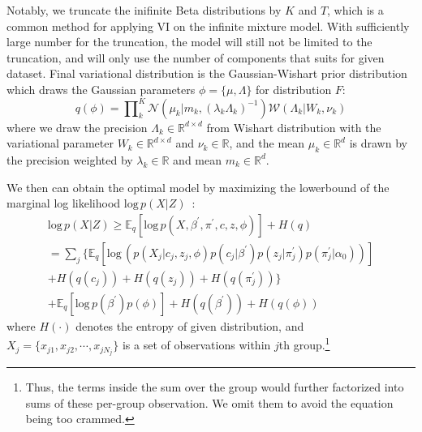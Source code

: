\documentclass{article}
\begin{document}
Notably, we truncate the inifinite Beta distributions by $K$ and $T$, which is a common method for applying VI on the infinite mixture model. With sufficiently large number for the truncation, the model will still not be limited to the truncation, and will only use the number of components that suits for given dataset. Final variational distribution is the Gaussian-Wishart prior distribution which draws the Gaussian parameters $\phi = \{\mu, \Lambda\}$ for distribution $F$:
\begin{equation}\label{eq:meanfield_normalwishart}
    q(\phi) = \textstyle \prod\nolimits_{k}^{K}\mathcal{N}(\mu_{k}|m_{k}, (\lambda_{k}\Lambda_{k})^{-1})\mathcal{W}(\Lambda_{k}|W_{k}, \nu_{k})
\end{equation}
where we draw the precision $\Lambda_{k}\in\mathbb{R}^{d \times d}$ from Wishart distribution with the variational parameter $W_{k}\in\mathbb{R}^{d \times d}$ and $\nu_{k}\in\mathbb{R}$, and the mean $\mu_{k}\in\mathbb{R}^{d}$ is drawn by the precision weighted by $\lambda_{k}\in\mathbb{R}$ and mean $m_{k}\in\mathbb{R}^{d}$.

We then can obtain the optimal model by maximizing the lowerbound of the marginal log likelihood $\text{log}\,p(X|Z)$~\cite{DBLP:journals/jei/BishopN07, DBLP:journals/ml/JordanGJS99, 10.1214/06-BA104}:
\begin{equation}\label{eq:lowerbound}
\begin{aligned}
    \text{log}\, p(X|Z) \geq \mathbb{E}_{q}[\text{log}\,p(X, \beta^{\prime}, \pi^{\prime}, c, z, \phi)] + H(q) \\
    = \textstyle \sum_{j} \big\{ \mathbb{E}_{q}[\text{log}\,(p(X_{j}|c_{j}, z_{j}, \phi)p(c_{j}|\beta^{\prime})p(z_{j}|\pi_{j}^{\prime})p(\pi^{\prime}_{j}|\alpha_{0}))] \\
    + H(q(c_{j})) + H(q(z_{j})) + H(q(\pi^{\prime}_{j})) \big\} \\
    + \mathbb{E}_{q}[\text{log}\,p(\beta^{\prime})p(\phi)] + H(q(\beta^{\prime})) + H(q(\phi))
\end{aligned}
\end{equation}
where $H(\cdot)$ denotes the entropy of given distribution, and $X_{j} = \{x_{j1}, x_{j2}, \cdots, x_{jN_{j}}\}$ is a set of observations within $j$th group.\footnote{Thus, the terms inside the sum over the group would further factorized into sums of these per-group observation. We omit them to avoid the equation being too crammed.}
\end{document}
